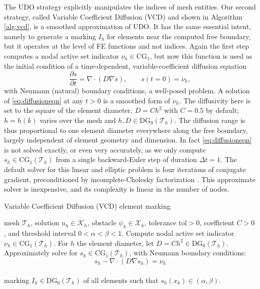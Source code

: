 \documentclass[]{interact}
\theoremstyle{plain}%
\theoremstyle{definition}
\theoremstyle{remark}
\newcommand{\grad}{\nabla}
\newcommand{\Div}{\nabla\cdot}
\newcommand{\cK}{\mathcal{K}}
\newcommand{\cT}{\mathcal{T}}
\newcommand{\cX}{\mathcal{X}}
\newcommand{\CG}{\text{CG}}
\newcommand{\DG}{\text{DG}}
\begin{document}
The UDO strategy explicitly manipulates the indices of mesh entities.  Our second strategy, called Variable Coefficient Diffusion (VCD) and shown in Algorithm \ref{alg:vcd}, is a smoothed approximation of UDO.  It has the same essential intent, namely to generate a marking $I_h$ for elements near the computed free boundary, but it operates at the level of FE functions and not indices.  Again the first step computes a nodal active set indicator $\nu_h \in \CG_1$, but now this function is used as the initial condition of a time-dependent, variable-coefficient diffusion equation
\begin{equation} \label{eq:diffusioneqn}
\frac{\partial s}{\partial t} = \Div\left(D \grad s\right), \qquad s(t=0) = \nu_h,
\end{equation}
with Neumann (natural) boundary conditions, a well-posed problem.  A solution of \eqref{eq:diffusioneqn} at any $t>0$ is a smoothed form of $\nu_h$.  The diffusivity here is set to the square of the element diameter, $D=C h^2$ with $C=0.5$ by default; $h=h(k)$ varies over the mesh and $h,D \in \DG_0(\cT_h)$.  The diffusion range is thus proportional to one element diameter everywhere along the free boundary, largely independent of element geometry and dimension.  In fact \eqref{eq:diffusioneqn} is not solved exactly, or even very accurately, as we only compute $s_h\in\CG_1(\cT_h)$ from a single backward-Euler step of duration $\Delta t = 1$.  The default solver for this linear and elliptic problem is four iterations of conjugate gradient, preconditioned by incomplete-Cholesky factorization \cite{Bueler2021}.  This approximate solver is inexpensive, and its complexity is linear in the number of nodes.

\begin{algorithm}[ht]
	\caption{Variable Coefficient Diffusion (VCD) element marking}
	\begin{algorithmic}[1]
		\Require mesh $\cT_h$, solution $u_h \in \cK_h$, obstacle $\psi_h \in \cX_h$, tolerance $\text{tol} > 0$, coefficient $C>0$, and threshold interval $0 < \alpha < \beta < 1$.
		\State Compute nodal active set indicator $\nu_h \in \CG_1(\cT_h)$.
		\State For $h$ the element diameter, let $D=C h^2 \in \DG_0(\cT_h)$.
		\State Approximately solve for $s_h\in\CG_1(\cT_h)$, with Neumann boundary conditions:
		  $$s_h - \Div(D \grad s_h) = \nu_h$$ \\
		\Return marking $I_h \in \DG_0(\cT_h)$ of all elements such that $s_h(x_k) \in (\alpha,\beta)$.
    \end{algorithmic}
\label{alg:vcd}
\end{algorithm}
\end{document}
